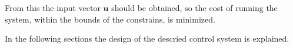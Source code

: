 From this the input vector $\pmb{u}$ should be obtained, so the cost of running the system, within the bounds of the constrains, is minimized. 



In the following sections the design of the descried control system is explained. 







